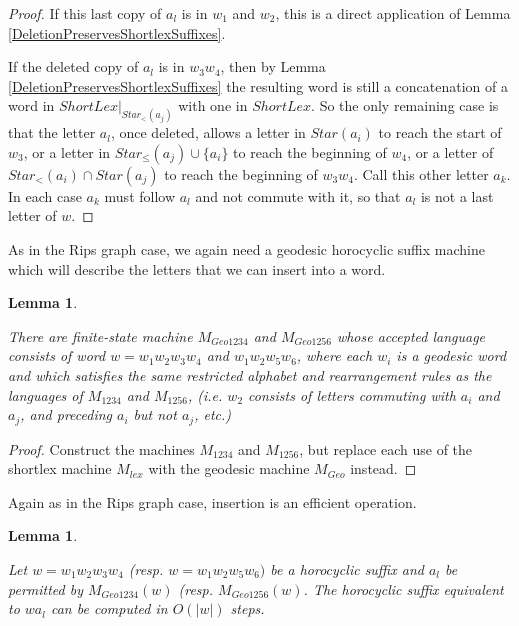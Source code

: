 \documentclass[10pt,a4paper]{amsart}
\newtheorem{lemma}[theorem]{Lemma}
\theoremstyle{definition}
\theoremstyle{remark}
\begin{document}
	\begin{proof}
		
		If this last copy of $a_l$ is in $w_1$ and $w_2$, this is a direct application of Lemma \ref{DeletionPreservesShortlexSuffixes}.
		
		If the deleted copy of $a_l$ is in $w_3w_4$, then by Lemma \ref{DeletionPreservesShortlexSuffixes} the resulting word is still a concatenation of a word in $ShortLex|_{Star_<(a_j)}$ with one in $ShortLex$. So the only remaining case is that the letter $a_l$, once deleted, allows a letter in $Star(a_i)$ to reach the start of $w_3$, or a letter in $Star_\le (a_j)\cup\{a_i\}$ to reach the beginning of $w_4$, or a letter of $Star_<(a_i)\cap Star(a_j)$ to reach the beginning of $w_3w_4$. Call this other letter $a_k$. In each case $a_k$ must follow $a_l$ and not commute with it, so that $a_l$ is not a last letter of $w$.
	\end{proof}
	
	As in the Rips graph case, we again need a geodesic horocyclic suffix machine which will describe the letters that we can insert into a word.
	
	\begin{lemma}\label{GeoHoroSuffMachine}
		
		There are finite-state machine $M_{Geo1234}$ and $M_{Geo1256}$ whose accepted language consists of word $w=w_1w_2w_3w_4$ and $w_1w_2w_5w_6$, where each $w_i$ is a geodesic word and which satisfies the same restricted alphabet and rearrangement rules as the languages of $M_{1234}$ and $M_{1256}$, (i.e. $w_2$ consists of letters commuting with $a_i$ and $a_j$, and preceding $a_i$ but not $a_j$, etc.)
		
	\end{lemma}
	
	\begin{proof}
		
		Construct the machines $M_{1234}$ and $M_{1256}$, but replace each use of the shortlex machine $M_{lex}$ with the geodesic machine $M_{Geo}$ instead.
	\end{proof}
	
	Again as in the Rips graph case, insertion is an efficient operation.
	
	\begin{lemma}\label{HorocyclicInsertion}
		
		Let $w=w_1w_2w_3w_4$ (resp. $w=w_1w_2w_5w_6)$ be a horocyclic suffix and $a_l$ be permitted by $M_{Geo1234}(w)$ (resp. $M_{Geo1256}(w)$. The horocyclic suffix equivalent to $wa_l$ can be computed in $O(|w|)$ steps.
		
	\end{lemma}
	
\end{document}
